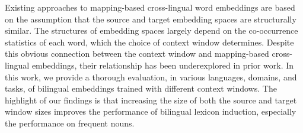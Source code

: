 Existing approaches to mapping-based cross-lingual word embeddings are based on the assumption that the source and target embedding spaces are structurally similar. The structures of embedding spaces largely depend on the co-occurrence statistics of each word, which the choice of context window determines. Despite this obvious connection between the context window and mapping-based cross-lingual embeddings, their relationship has been underexplored in prior work. In this work, we provide a thorough evaluation, in various languages, domains, and tasks, of bilingual embeddings trained with different context windows. The highlight of our findings is that increasing the size of both the source and target window sizes improves the performance of bilingual lexicon induction, especially the performance on frequent nouns.
